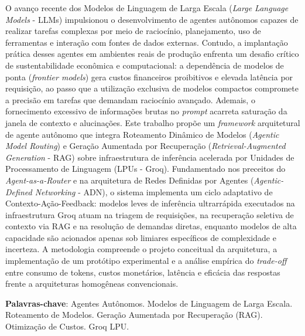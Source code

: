 \begin{resumo}
O avanço recente dos Modelos de Linguagem de Larga Escala (\textit{Large Language Models} - LLMs) impulsionou o desenvolvimento de agentes autônomos capazes de realizar tarefas complexas por meio de raciocínio, planejamento, uso de ferramentas e interação com fontes de dados externas. Contudo, a implantação prática desses agentes em ambientes reais de produção enfrenta um desafio crítico de sustentabilidade econômica e computacional: a dependência de modelos de ponta (\textit{frontier models}) gera custos financeiros proibitivos e elevada latência por requisição, ao passo que a utilização exclusiva de modelos compactos compromete a precisão em tarefas que demandam raciocínio avançado. Ademais, o fornecimento excessivo de informações brutas no \textit{prompt} acarreta saturação da janela de contexto e alucinações. Este trabalho propõe um \textit{framework} arquitetural de agente autônomo que integra Roteamento Dinâmico de Modelos (\textit{Agentic Model Routing}) e Geração Aumentada por Recuperação (\textit{Retrieval-Augmented Generation} - RAG) sobre infraestrutura de inferência acelerada por Unidades de Processamento de Linguagem (LPUs - Groq). Fundamentado nos preceitos do \textit{Agent-as-a-Router} e na arquitetura de Redes Definidas por Agentes (\textit{Agentic-Defined Networking} - ADN), o sistema implementa um ciclo adaptativo de Contexto-Ação-Feedback: modelos leves de inferência ultrarrápida executados na infraestrutura Groq atuam na triagem de requisições, na recuperação seletiva de contexto via RAG e na resolução de demandas diretas, enquanto modelos de alta capacidade são acionados apenas sob limiares específicos de complexidade e incerteza. A metodologia compreende o projeto conceitual da arquitetura, a implementação de um protótipo experimental e a análise empírica do \textit{trade-off} entre consumo de tokens, custos monetários, latência e eficácia das respostas frente a arquiteturas homogêneas convencionais.

\vspace{\onelineskip}
    
\noindent
\textbf{Palavras-chave}: Agentes Autônomos. Modelos de Linguagem de Larga Escala. Roteamento de Modelos. Geração Aumentada por Recuperação (RAG). Otimização de Custos. Groq LPU.
\end{resumo}
